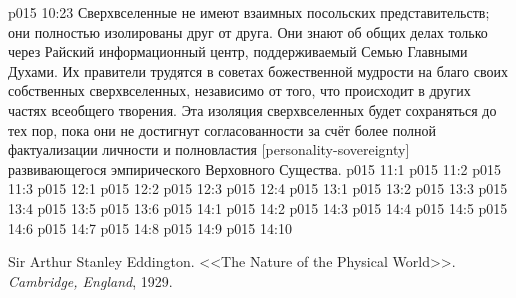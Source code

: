 \vs p015 10:23 Сверхвселенные не имеют взаимных посольских представительств; они полностью изолированы друг от друга. Они знают об общих делах только через Райский информационный центр, поддерживаемый Семью Главными Духами. Их правители трудятся в советах божественной мудрости на благо своих собственных сверхвселенных, независимо от того, что происходит в других частях всеобщего творения. Эта изоляция сверхвселенных будет сохраняться до тех пор, пока они не достигнут согласованности за счёт более полной фактуализации личности и полновластия [personality\hyp{}sovereignty] развивающегося эмпирического Верховного Существа.
\vs p015 11:1 
\vs p015 11:2 
\vs p015 11:3 
\vs p015 12:1 
\vs p015 12:2 
\vs p015 12:3 
\vs p015 12:4 
\vs p015 13:1 
\vs p015 13:2 
\vs p015 13:3 
\vs p015 13:4 \pc 
\vs p015 13:5 
\vs p015 13:6 
\vs p015 14:1 
\vs p015 14:2 
\vs p015 14:3 
\vs p015 14:4 
\vs p015 14:5 \pc 
\vs p015 14:6 
\vs p015 14:7 
\vs p015 14:8 
\vs p015 14:9 \pc 
\vsetoff
\vs p015 14:10 
\quizlink
\begin{thebibliography}{100}
Sir Arthur Stanley Eddington.
{<<The Nature of the Physical World>>.}
{\em Cambridge, England}, 1929.
\end{thebibliography}
